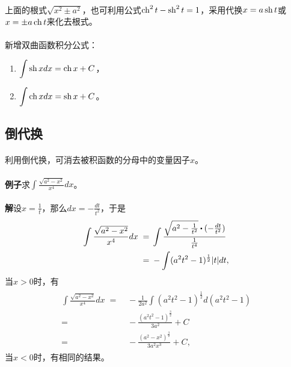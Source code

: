 \paragraph{}
上面的根式$\sqrt{x^2 \pm a^2}$，也可利用公式$\operatorname{ch}^2t - \operatorname{sh}^2t = 1$，采用代换$x=a\operatorname{sh}{t}$或$x=\pm a\operatorname{ch}{t}$来化去根式。

\paragraph{}
新增双曲函数积分公式：
\begin{enumerate}
  \item $\displaystyle\int\operatorname{sh}{x}dx = \operatorname{ch}{x} + C$，
  \item $\displaystyle\int\operatorname{ch}{x}dx = \operatorname{sh}{x} + C$。
\end{enumerate}

\subsection{倒代换}
\paragraph{}
利用倒代换，可消去被积函数的分母中的变量因子$x$。

\paragraph{}
\textbf{例子\;}求$\displaystyle\int\frac{\sqrt{a^2-x^2}}{x^4}dx$。

\paragraph{}
\textbf{解\;}设$\displaystyle x=\frac{1}{t}$，那么$\displaystyle dx = -\frac{dt}{t^2}$，于是
\begin{align*}
\begin{split}
  \int\frac{\sqrt{a^2-x^2}}{x^4}dx \;=&\; \int\frac{\sqrt{a^2-\frac{1}{t^2}} \bigcdot (-\frac{dt}{t^2})}{\frac{1}{t^4}} \\
  =&\; -\int(a^2t^2-1)^{\frac{1}{2}}|t|dt,
\end{split}
\end{align*}
当$x>0$时，有
\begin{align*}
\begin{split}
  \int\frac{\sqrt{a^2-x^2}}{x^4}dx \;=&\; -\frac{1}{2a^2}\int(a^2t^2-1)^{\frac{1}{2}}d(a^2t^2-1) \\
  =&\; -\frac{(a^2t^2-1)^{\frac{3}{2}}}{3a^2} + C \\
  =&\; -\frac{(a^2-x^2)^{\frac{3}{2}}}{3a^2x^3} + C,
\end{split}
\end{align*}
当$x<0$时，有相同的结果。
